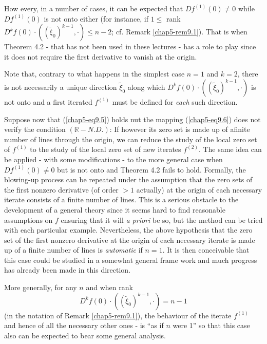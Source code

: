 How every, in a number of cases, it can be expected that $Df^{(1)} (0)
\neq 0$ while $Df^{(1)}(0)$ is not onto either (for instance, if $1
\leq$ rank $D^{k}f(0) \cdot ((\widetilde{\xi}_{0})^{k-1}, \cdot) \leq
n-2$; cf. Remark \ref{chap5-rem9.1}). That is when Theorem
4.2 - that has not been used in these lectures - has a
role to play since it does not require the first derivative to vanish
at the origin.

Note that, contrary to what happens in the simplest case $n = 1$ and
$k = 2$, there is not necessarily a unique direction
$\widetilde{\xi}_{0}$ along which $D^{k}f(0) \cdot
((\widetilde{\xi}_{0})^{k-1}, \cdot)$ is not onto and a first iterated
$f^{(1)}$ must be defined for {\em each} such direction.

Suppose now that (\ref{chap5-eq9.5}) holds nut the mapping
(\ref{chap5-eq9.6}) does not verify the condition $(\mathbb{R}- N.D.)$: If however its zero set is made up of a\pageoriginale finite number
of lines through the origin, we can reduce the study of the local zero
set of $f^{(1)}$ to the study of the local zero set of new iterates $f^{(2)}$.
The same idea can be applied - with some modifications - to the more general case when $Df^{(1)}(0) \neq 0$ but is not onto and Theorem 4.2 fails to hold. Formally, the blowing-up process can be repeated under the assumption that the zero sets of the first nonzero derivative (of order $> 1$ actually) at the origin of each necessary iterate consists of a finite number of lines. This is a serious obstacle to the development of a general theory since it seems hard to find reasonable assumptions on $f$ ensuring that it will {\em a priori} be so, but the method can be tried with each particular example. Nevertheless, the above hypothesis that the zero set of the first nonzero derivative at the origin of each necessary iterate is made up of a finite number of lines is {\em automatic} if $n = 1$. It is then conceivable that this case could be studied in a somewhat general frame work and much progress has already been made in this direction.

\begin{remark}\label{chap5-rem9.2}
More generally, for any $n$ and when rank 
$$D^{k}f(0) \cdot ((\widetilde{\xi}_{0})^{k-1}, \cdot) = n-1$$ 
(in the notation of Remark \ref{chap5-rem9.1}), the behaviour of the iterate $f^{(1)}$ and hence of all the necessary other ones - is ``as if $n$ were 1'' so that this case also can be expected to bear some general analysis.
\end{remark}

